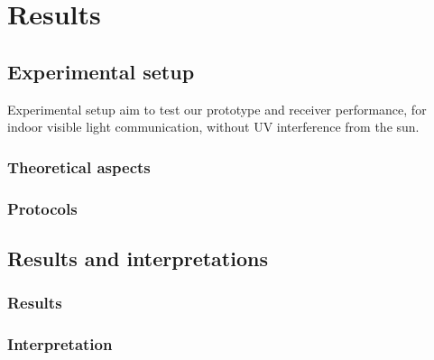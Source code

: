 
\chapter{Results} %

\label{Results} %



\section{Experimental setup}

Experimental setup aim to test our prototype and receiver performance, for indoor visible light communication, without UV interference from the sun.




\subsection{Theoretical aspects}
\subsection{Protocols}



\section{Results and interpretations}

\subsection{Results}
\subsection{Interpretation}